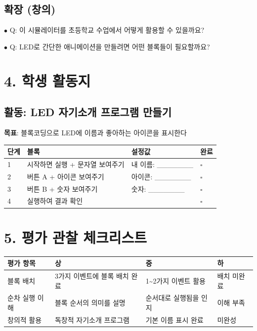 \documentclass[11pt,a4paper]{article}
\begin{document}
\subsection*{확장 (창의)}

$\bullet$ Q: 이 시뮬레이터를 초등학교 수업에서 어떻게 활용할 수 있을까요?

$\bullet$ Q: LED로 간단한 애니메이션을 만들려면 어떤 블록들이 필요할까요?



\section*{4. 학생 활동지}

\subsection*{활동: LED 자기소개 프로그램 만들기}

\textbf{목표}: 블록코딩으로 LED에 이름과 좋아하는 아이콘을 표시한다


\begin{center}
\renewcommand{\arraystretch}{1.4}
\begin{tabular}{|p{1.5cm}|p{7.6cm}|p{4.4cm}|p{1.5cm}|}
\hline
\rowcolor{tableheader}
\textbf{단계} & \textbf{블록} & \textbf{설정값} & \textbf{완료} \\
\hline
1 & 시작하면 실행 + 문자열 보여주기 & 내 이름: \_\_\_\_\_\_\_ & $\square$ \\
\hline
2 & 버튼 A + 아이콘 보여주기 & 아이콘: \_\_\_\_\_\_\_ & $\square$ \\
\hline
3 & 버튼 B + 숫자 보여주기 & 숫자: \_\_\_\_\_\_\_ & $\square$ \\
\hline
4 & 실행하여 결과 확인 &  & $\square$ \\
\hline
\end{tabular}
\end{center}


\section*{5. 평가 관찰 체크리스트}

\begin{center}
\renewcommand{\arraystretch}{1.4}
\begin{tabular}{|p{2.8cm}|p{5.7cm}|p{4.3cm}|p{2.2cm}|}
\hline
\rowcolor{tableheader}
\textbf{평가 항목} & \textbf{상} & \textbf{중} & \textbf{하} \\
\hline
블록 배치 & 3가지 이벤트에 블록 배치 완료 & 1\textasciitilde{}2가지 이벤트 활용 & 배치 미완료 \\
\hline
순차 실행 이해 & 블록 순서의 의미를 설명 & 순서대로 실행됨을 인지 & 이해 부족 \\
\hline
창의적 활용 & 독창적 자기소개 프로그램 & 기본 이름 표시 완료 & 미완성 \\
\hline
\end{tabular}
\end{center}
\end{document}
